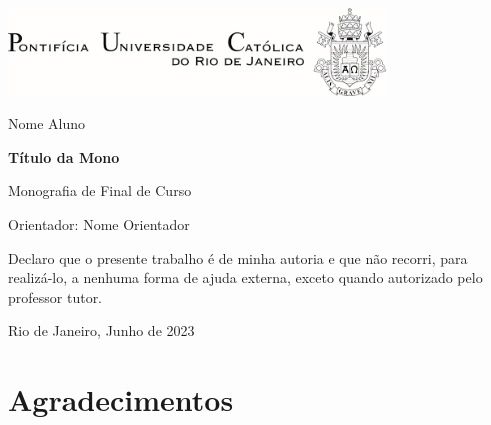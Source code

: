 \documentclass[12pt,openright,twoside,a4paper,brazil,english,emptypage,openany]{abntex2}
\begin{document}
\pretextual
{}

\setlength{\parskip}{10pt}



\pagestyle{fancy}%


\fancyhf{}%
\fancyhead[LE,LO]{\textit{\sffamily{\nouppercase{\newlinetospace{{\leftmark}}}}}}
\fancyhead[RE,RO]{\thepage}

\flushright
\thispagestyle{empty}%
\includegraphics[width=10cm]{logo_puc.png}

\vspace{20pt}

\large{Nome Aluno}

\vspace{100pt}

\Large{\textbf{\sffamily Título da Mono}}

\vspace{90pt}

\normalsize
Monografia de Final de Curso

\vspace{2pt}

Orientador: Nome Orientador

\vspace{40pt}

\centering

Declaro que o presente trabalho é de minha autoria e que não recorri, para realizá-lo, a nenhuma forma de ajuda externa, exceto quando autorizado pelo professor tutor.

\vspace{60pt}

Rio de Janeiro, Junho de 2023

\flushleft
\pagebreak




\section*{\large Agradecimentos}
\justifying
\end{document}
